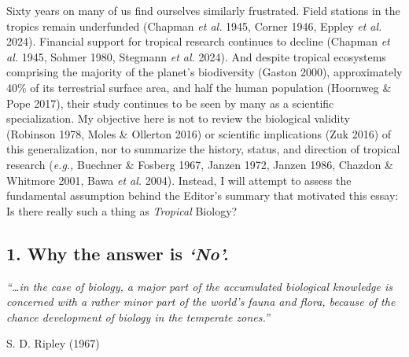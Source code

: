 \documentclass[
  12pt,
  man, donotrepeattitle,floatsintext]{apa6}
\begin{document}
Sixty years on many of us find ourselves similarly frustrated. Field stations in the tropics remain underfunded (Chapman \emph{et al.} 1945, Corner 1946, Eppley \emph{et al.} 2024). Financial support for tropical research continues to decline (Chapman \emph{et al.} 1945, Sohmer 1980, Stegmann \emph{et al.} 2024). And despite tropical ecosystems comprising the majority of the planet's biodiversity (Gaston 2000), approximately 40\% of its terrestrial surface area, and half the human population (Hoornweg \& Pope 2017), their study continues to be seen by many as a scientific specialization. My objective here is not to review the biological validity (Robinson 1978, Moles \& Ollerton 2016) or scientific implications (Zuk 2016) of this generalization, nor to summarize the history, status, and direction of tropical research (\emph{e.g.,} Buechner \& Fosberg 1967, Janzen 1972, Janzen 1986, Chazdon \& Whitmore 2001, Bawa \emph{et al.} 2004). Instead, I will attempt to assess the fundamental assumption behind the Editor's summary that motivated this essay: Is there really such a thing as \emph{Tropical} Biology?

\hypertarget{why-the-answer-is-no.}{%
\subsection{\texorpdfstring{1. Why the answer is \emph{`No'.}}{1. Why the answer is `No'.}}\label{why-the-answer-is-no.}}

\noindent \emph{``\ldots in the case of biology, a major part of the accumulated biological knowledge is concerned with a rather minor part of the world's fauna and flora, because of the chance development of biology in the temperate zones.''}

\hfill S. D. Ripley (1967)
\bigskip
\end{document}
